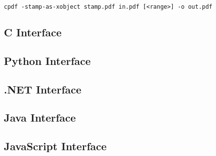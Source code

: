 \documentclass{book}
\begin{document}
\begin{framed}
  \noindent\small\verb!cpdf -stamp-as-xobject stamp.pdf in.pdf [<range>] -o out.pdf!
\end{framed}

\begin{cpdflib}
\clearpage
\section*{C Interface}
\begin{small}\tt

\end{small}
\end{cpdflib}

\begin{pycpdflib}
\clearpage
\section*{Python Interface}
\begin{small}\tt

\end{small}
\end{pycpdflib}

\begin{dotnetcpdflib}
\clearpage
\section*{.NET Interface}
\begin{small}\tt

\end{small}
\end{dotnetcpdflib}

\begin{jcpdflib}
\clearpage
\section*{Java Interface}
\begin{small}\tt

\end{small}
\end{jcpdflib}

\begin{jscpdflib}
\clearpage
\section*{JavaScript Interface}
\begin{small}\tt

\end{small}
\end{jscpdflib}
\end{document}
